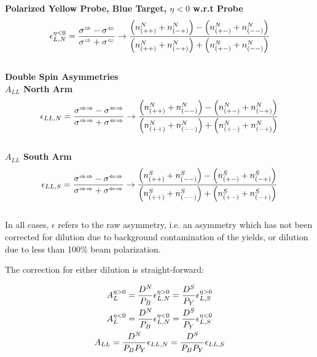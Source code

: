 \noindent\textbf{Polarized Yellow Probe, Blue Target, $\eta < 0$ w.r.t Probe}
\begin{equation}
  {\epsilon_{L,N}^{\eta < 0}} 
  = 
  { 
    {\sigma^\Rightarrow-\sigma^\Leftarrow} 
    \over 
    {\sigma^\Rightarrow+\sigma^\Leftarrow} 
  } 
  \to 
  {
    {\left(n_{(++)}^N+n_{(-+)}^N\right)-\left(n_{(+-)}^N+n_{(--)}^N\right)}
    \over
    {\left(n_{(++)}^N+n_{(-+)}^N\right)+\left(n_{(+-)}^N+n_{(--)}^N\right)}
  }
  \label{eq:al_yell_probe_neg_rap}
\end{equation}\\

\noindent\textbf{Double Spin Asymmetries} \\

\noindent\textbf{$A_{LL}$ North Arm}
\begin{equation}
  {\epsilon_{LL,N}}
  = 
  { 
    {\sigma^{\Rightarrow\Rightarrow}-\sigma^{\Leftarrow\Rightarrow}} 
    \over 
    {\sigma^{\Rightarrow\Rightarrow}+\sigma^{\Leftarrow\Rightarrow}} 
  } 
  \to 
  {
    {\left(n_{(++)}^N+n_{(--)}^N\right)-\left(n_{(+-)}^N+n_{(-+)}^N\right)}
    \over
    {\left(n_{(++)}^N+n_{(--)}^N\right)+\left(n_{(+-)}^N+n_{(-+)}^N\right)}
  }
  \label{eq:all_north}
\end{equation}\\

\noindent\textbf{$A_{LL}$ South Arm}
\begin{equation}
  {\epsilon_{LL,S}}
  = 
  { 
    {\sigma^{\Rightarrow\Rightarrow}-\sigma^{\Leftarrow\Rightarrow}} 
    \over 
    {\sigma^{\Rightarrow\Rightarrow}+\sigma^{\Leftarrow\Rightarrow}} 
  } 
  \to 
  {
    {\left(n_{(++)}^S+n_{(--)}^S\right)-\left(n_{(+-)}^S+n_{(-+)}^S\right)}
    \over
    {\left(n_{(++)}^S+n_{(--)}^S\right)+\left(n_{(+-)}^S+n_{(-+)}^S\right)}
  }
  \label{eq:all_south}
\end{equation}\\

In all cases, $\epsilon$ refers to the raw asymmetry, i.e. an asymmetry which
has not been corrected for dilution due to background contamination of the
yields, or dilution due to less than 100\% beam polarization.

{\noindent}The correction for either dilution is straight-forward:

\begin{gather}
  {A_L^{\eta>0}} = {{D^N}\over{P_B}}{\epsilon_{L,N}^{\eta>0}} = {{D^S}\over{P_Y}}{\epsilon_{L,S}^{\eta>0}} \\
  {A_L^{\eta<0}} = {{D^N}\over{P_B}}{\epsilon_{L,N}^{\eta<0}} = {{D^S}\over{P_Y}}{\epsilon_{L,S}^{\eta<0}} \\
  {A_{LL}}       = {{D^N}\over{P_BP_Y}}{\epsilon_{LL,N}}      = {{D^S}\over{P_BP_Y}}{\epsilon_{LL,S}}       
  \label{eq:dilution_correction}
\end{gather}

